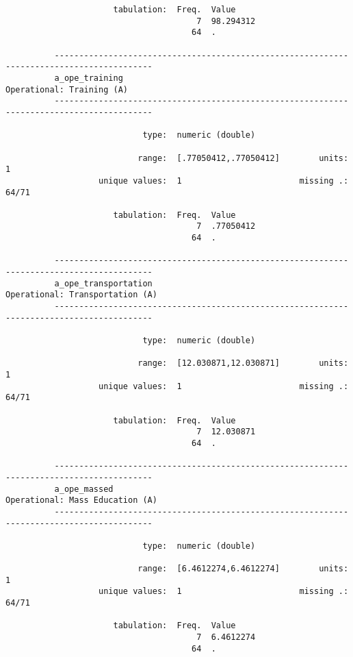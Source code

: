 \documentclass{article}
\begin{document}
\begin{verbatim}
                      tabulation:  Freq.  Value
                                       7  98.294312
                                      64  .
          
          ------------------------------------------------------------------------------------------
          a_ope_training                                                   Operational: Training (A)
          ------------------------------------------------------------------------------------------
          
                            type:  numeric (double)
          
                           range:  [.77050412,.77050412]        units:  1
                   unique values:  1                        missing .:  64/71
          
                      tabulation:  Freq.  Value
                                       7  .77050412
                                      64  .
          
          ------------------------------------------------------------------------------------------
          a_ope_transportation                                       Operational: Transportation (A)
          ------------------------------------------------------------------------------------------
          
                            type:  numeric (double)
          
                           range:  [12.030871,12.030871]        units:  1
                   unique values:  1                        missing .:  64/71
          
                      tabulation:  Freq.  Value
                                       7  12.030871
                                      64  .
          
          ------------------------------------------------------------------------------------------
          a_ope_massed                                               Operational: Mass Education (A)
          ------------------------------------------------------------------------------------------
          
                            type:  numeric (double)
          
                           range:  [6.4612274,6.4612274]        units:  1
                   unique values:  1                        missing .:  64/71
          
                      tabulation:  Freq.  Value
                                       7  6.4612274
                                      64  .
          

\end{verbatim}
\end{document}
